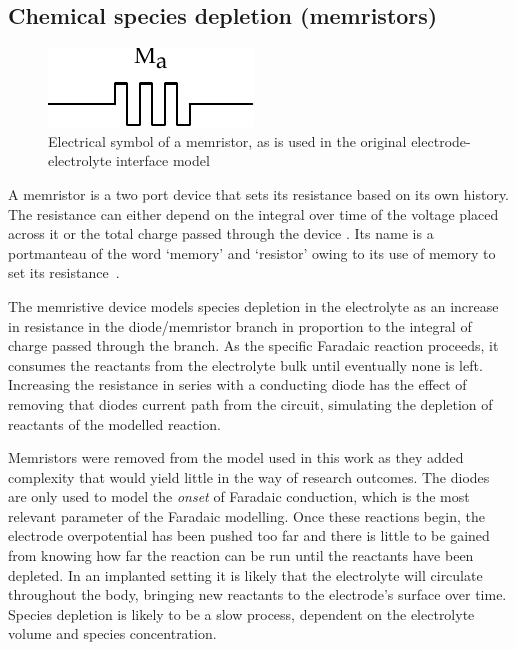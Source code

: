   \subsection{Chemical species depletion (memristors)}


    \begin{figure}[h]
      \centering
      \includegraphics{content/pt2/07-InterfaceModel/graphics/memristorSymbol}
      \caption{\label{fig:pt2-memristorSymbol}Electrical symbol of a memristor, as is used in the original electrode-electrolyte interface model}
    \end{figure}

    A memristor is a two port device that sets its resistance based on its own history.
    The resistance can either depend on the integral over time of the voltage placed across it or the total charge passed through the device \cite{Kvatinsky2012}.
    Its name is a portmanteau of the word `memory' and `resistor' owing to its use of memory to set its resistance~\cite{Williams2008}.

    The memristive device models species depletion in the electrolyte as an increase in resistance in the diode/memristor branch in proportion to the integral of charge passed through the branch.
    As the specific Faradaic reaction proceeds, it consumes the reactants from the electrolyte bulk until eventually none is left.
    Increasing the resistance in series with a conducting diode has the effect of removing that diodes current path from the circuit, simulating the depletion of reactants of the modelled reaction.

    Memristors were removed from the model used in this work as they added complexity that would yield little in the way of research outcomes.
    The diodes are only used to model the \emph{onset} of Faradaic conduction, which is the most relevant parameter of the Faradaic modelling.
    Once these reactions begin, the electrode overpotential has been pushed too far and there is little to be gained from knowing how far the reaction can be run until the reactants have been depleted.
    In an implanted setting it is likely that the electrolyte will circulate throughout the body, bringing new reactants to the electrode's surface over time.
    Species depletion is likely to be a slow process, dependent on the electrolyte volume and species concentration.

